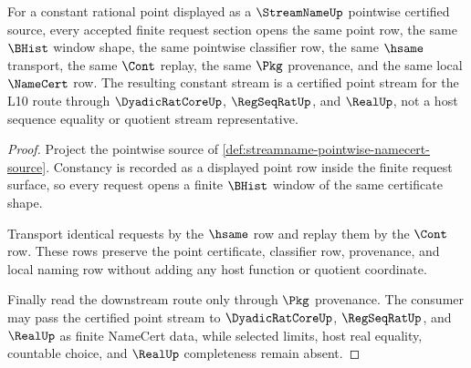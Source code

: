 \begin{theorem}
\label{thm:streamname-constant-certified-point}
For a constant rational point displayed as a $\StreamNameUp$ pointwise certified source, every accepted finite request section opens the same point row, the same $\BHist$ window shape, the same pointwise classifier row, the same $\hsame$ transport, the same $\Cont$ replay, the same $\Pkg$ provenance, and the same local $\NameCert$ row. The resulting constant stream is a certified point stream for the L10 route through $\DyadicRatCoreUp$, $\RegSeqRatUp$, and $\RealUp$, not a host sequence equality or quotient stream representative.
\end{theorem}
\begin{proof}
Project the pointwise source of \autoref{def:streamname-pointwise-namecert-source}. Constancy is recorded as a displayed point row inside the finite request surface, so every request opens a finite $\BHist$ window of the same certificate shape.

Transport identical requests by the $\hsame$ row and replay them by the $\Cont$ row. These rows preserve the point certificate, classifier row, provenance, and local naming row without adding any host function or quotient coordinate.

Finally read the downstream route only through $\Pkg$ provenance. The consumer may pass the certified point stream to $\DyadicRatCoreUp$, $\RegSeqRatUp$, and $\RealUp$ as finite NameCert data, while selected limits, host real equality, countable choice, and $\RealUp$ completeness remain absent.
\end{proof}


